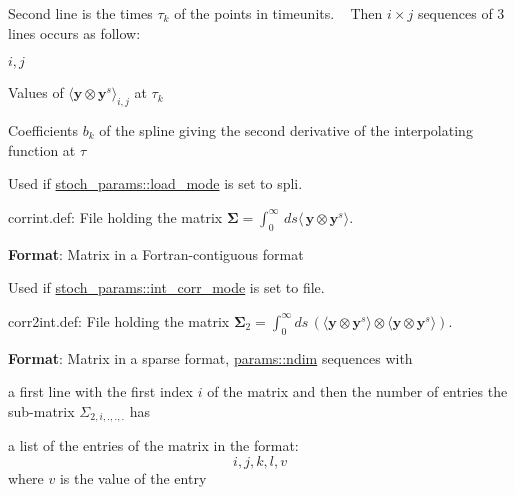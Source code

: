 \begin{DoxyItemize}
\begin{DoxyItemize}
 Second line is the times $\tau_k$ of the points in timeunits. ~\newline
 Then $i\times j$ sequences of 3 lines occurs as follow\+:
\begin{DoxyEnumerate}
\item $i,j$
\item Values of $\langle \boldsymbol y \otimes \boldsymbol y^s \rangle_{i,j}$ at $\tau_k$
\item Coefficients $b_k$ of the spline giving the second derivative of the interpolating function at $\tau$
\end{DoxyEnumerate}
\item Used if \hyperlink{namespacestoch__params_ac61a48744a1bb015b5148c421837fbe7}{stoch\+\_\+params\+::load\+\_\+mode} is set to \textquotesingle{}spli\textquotesingle{}.
\end{DoxyItemize}
\item \textquotesingle{}corrint.\+def\textquotesingle{}\+: File holding the matrix $\boldsymbol\Sigma = \int_0^\infty \, ds \langle \, \boldsymbol y \otimes \boldsymbol y^s \rangle $.
\begin{DoxyItemize}
\item {\bfseries Format}\+: Matrix in a Fortran-\/contiguous format
\item Used if \hyperlink{namespacestoch__params_ab901db3992a4df88db5a67fdd7be6ac6}{stoch\+\_\+params\+::int\+\_\+corr\+\_\+mode} is set to \textquotesingle{}file\textquotesingle{}.
\end{DoxyItemize}
\item \textquotesingle{}corr2int.\+def\textquotesingle{}\+: File holding the matrix $\boldsymbol\Sigma_2 = \int_0^\infty ds \, \left(\langle \boldsymbol y \otimes \boldsymbol y^s \rangle \otimes \langle \boldsymbol y \otimes \boldsymbol y^s \rangle\right) $.
\begin{DoxyItemize}
\item {\bfseries Format}\+: Matrix in a sparse format, \hyperlink{namespaceparams_a2323fe1773f086e20c14f266351c482b}{params\+::ndim} sequences with
\begin{DoxyEnumerate}
\item a first line with the first index $i$ of the matrix and then the number of entries the sub-\/matrix $\Sigma_{2,i,.,.,.}$ has
\item a list of the entries of the matrix in the format\+: \[ i,j,k,l,v\] where $v$ is the value of the entry 


\end{DoxyEnumerate}
\end{DoxyItemize}
\end{DoxyItemize}


